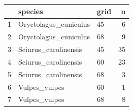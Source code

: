 \begin{table}[ht]
\centering
\begin{tabular}{rllr}
  \hline
 & species & grid & n \\ 
  \hline
1 & Oryctolagus\_cuniculus & 45 &   6 \\ 
  2 & Oryctolagus\_cuniculus & 68 &   9 \\ 
  3 & Sciurus\_carolinensis & 45 &  35 \\ 
  4 & Sciurus\_carolinensis & 60 &  23 \\ 
  5 & Sciurus\_carolinensis & 68 &   3 \\ 
  6 & Vulpes\_vulpes & 60 &   1 \\ 
  7 & Vulpes\_vulpes & 68 &   8 \\ 
   \hline
\end{tabular}
\end{table}

